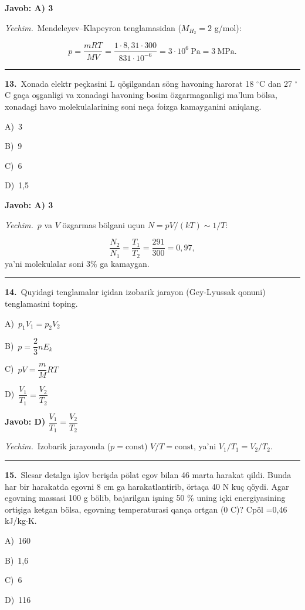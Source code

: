\documentclass[11pt,a4paper]{article}
\newcommand{\opt}[2]{\hspace*{4mm}#1)\ #2\par}
\begin{document}
\noindent\colorbox{gray!12}{\parbox{\dimexpr\linewidth-2\fboxsep}{\textbf{Javob: A) 3}}}\par\smallskip
\noindent\textit{Yechim.}\ Mendeleyev–Klapeyron tenglamasidan ($M_{H_2}=2$ g/mol):\par
\[p=\frac{mRT}{MV}=\frac{1\cdot8{,}31\cdot300}{831\cdot10^{-6}}=3\cdot10^{6}\ \text{Pa}=3\ \text{MPa}.\]\par\medskip\hrule\medskip
{}\noindent\begin{minipage}{\linewidth}
\textbf{13.}\ Xonada elektr peçkasini L qöşilgandan söng havoning harorat 18 $^\circ$C dan 27 $^\circ$C gaça oşganligi va xonadagi havoning bosim özgarmaganligi ma’lum bölsa, xonadagi havo molekulalarining soni neça foizga kamayganini aniqlang.\par\smallskip
\opt{A}{3}
\opt{B}{9}
\opt{C}{6}
\opt{D}{1,5}
\end{minipage}\vspace{2pt}\par
\noindent\colorbox{gray!12}{\parbox{\dimexpr\linewidth-2\fboxsep}{\textbf{Javob: A) 3}}}\par\smallskip
\noindent\textit{Yechim.}\ $p$ va $V$ özgarmas bölgani uçun $N=pV/(kT)\sim1/T$:\par
\[\frac{N_2}{N_1}=\frac{T_1}{T_2}=\frac{291}{300}=0{,}97,\]
ya’ni molekulalar soni $3\%$ ga kamaygan.\par\par\medskip\hrule\medskip
{}\noindent\begin{minipage}{\linewidth}
\textbf{14.}\ Quyidagi tenglamalar içidan izobarik jarayon (Gey-Lyussak qonuni) tenglamasini toping.\par\smallskip
\opt{A}{$p_1V_1=p_2V_2$}
\opt{B}{$p=\dfrac23nE_k$}
\opt{C}{$pV=\dfrac{m}{M}RT$}
\opt{D}{$\dfrac{V_1}{T_1}=\dfrac{V_2}{T_2}$}
\end{minipage}\vspace{2pt}\par
\noindent\colorbox{gray!12}{\parbox{\dimexpr\linewidth-2\fboxsep}{\textbf{Javob: D) $\dfrac{V_1}{T_1}=\dfrac{V_2}{T_2}$}}}\par\smallskip
\noindent\textit{Yechim.}\ Izobarik jarayonda ($p=\text{const}$) $V/T=\text{const}$, ya’ni $V_1/T_1=V_2/T_2$.\par\par\medskip\hrule\medskip
{}\noindent\begin{minipage}{\linewidth}
\textbf{15.}\ Slesar detalga işlov berişda pölat egov bilan 46 marta harakat qildi. Bunda har bir harakatda egovni 8 cm ga harakatlantirib, örtaça 40 N kuç qöydi. Agar egovning massasi 100 g bölib, bajarilgan işning 50 \% uning içki energiyasining ortişiga ketgan bölsa, egovning temperaturasi qança ortgan (0 C)? Cpöl =0,46 kJ/kg$\cdot$K.\par\smallskip
\opt{A}{160}
\opt{B}{1,6}
\opt{C}{6}
\opt{D}{116}
\end{minipage}\vspace{2pt}\par
\end{document}
